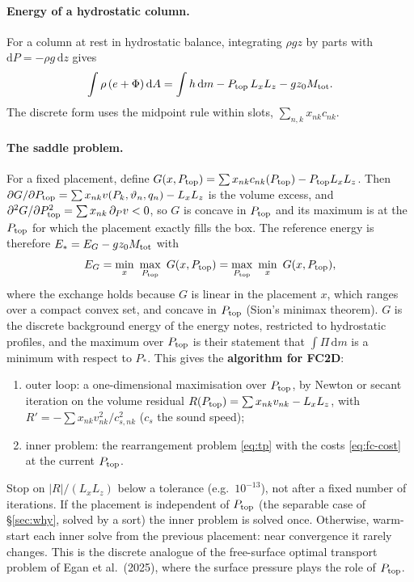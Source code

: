 \documentclass[11pt,a4paper]{article}
\newcommand{\vt}{\vartheta}
\newcommand{\Mtot}{M_{\rm tot}}
\newcommand{\Ptop}{P_{\rm top}}
\begin{document}
\paragraph{Energy of a hydrostatic column.} For a column at rest in hydrostatic balance, integrating $\rho g z$ by parts with
$\mathrm{d}P=-\rho g\,\mathrm{d}z$ gives
\begin{equation}
  \int\rho\,(e+\Phi)\,\mathrm{d}A=\int h\,\mathrm{d}m-\Ptop\,L_xL_z-g z_0\Mtot .
  \label{eq:column-energy}
\end{equation}
The discrete form uses the midpoint rule within slots, $\sum_{n,k}x_{nk}c_{nk}$.

\paragraph{The saddle problem.} For a fixed placement, define $G(x,\Ptop)=\sum x_{nk}c_{nk}(\Ptop)-\Ptop L_xL_z$. Then
$\partial G/\partial\Ptop=\sum x_{nk}v(P_k,\vt_n,q_n)-L_xL_z$ is the volume excess, and
$\partial^2G/\partial\Ptop^2=\sum x_{nk}\,\partial_Pv<0$, so $G$ is concave in $\Ptop$ and its maximum is at the $\Ptop$ for
which the placement exactly fills the box. The reference energy is therefore $E_*=E_G-gz_0\Mtot$ with
\begin{equation}
  E_G=\min_x\ \max_{\Ptop}\ G(x,\Ptop)=\max_{\Ptop}\ \min_x\ G(x,\Ptop),
  \label{eq:saddle}
\end{equation}
where the exchange holds because $G$ is linear in the placement $x$, which ranges over a compact convex set, and concave in
$\Ptop$ (Sion's minimax theorem). $G$ is the discrete background energy of the energy notes, restricted to hydrostatic
profiles, and the maximum over $\Ptop$ is their statement that $\int\Pi\,\mathrm{d}m$ is a minimum with respect to $P_*$.
This gives the \textbf{algorithm for FC2D}:
\begin{enumerate}
  \item outer loop: a one-dimensional maximisation over $\Ptop$, by Newton or secant iteration on the volume residual
        $R(\Ptop)=\sum x_{nk}v_{nk}-L_xL_z$, with $R'=-\sum x_{nk}v_{nk}^2/c_{s,nk}^2$ ($c_s$ the sound speed);
  \item inner problem: the rearrangement problem \eqref{eq:tp} with the costs \eqref{eq:fc-cost} at the current $\Ptop$.
\end{enumerate}
Stop on $|R|/(L_xL_z)$ below a tolerance (e.g.\ $10^{-13}$), not after a fixed number of iterations. If the placement is
independent of $\Ptop$ (the separable case of \S\ref{sec:why}, solved by a sort) the inner problem is solved once. Otherwise,
warm-start each inner solve from the previous placement: near convergence it rarely changes.
This is the discrete analogue of the free-surface optimal transport problem of Egan et al.\ (2025), where the surface
pressure plays the role of $\Ptop$.
\end{document}
